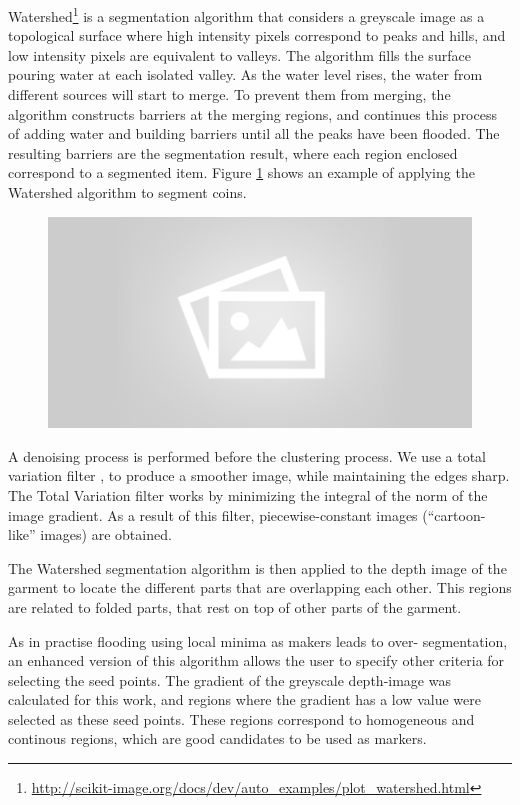 Watershed\footnote{\url{http://scikit-image.org/docs/dev/auto_examples/plot_watershed.html}} is a segmentation algorithm that considers a greyscale image as a topological surface where high intensity pixels correspond to peaks and hills, and low intensity pixels are equivalent to valleys. The algorithm fills the surface pouring water at each isolated valley. As the water level rises, the water from different sources will start to merge. To prevent them from merging, the algorithm constructs barriers at the merging regions, and continues this process of adding water and building barriers until all the peaks have been flooded. The resulting barriers are the segmentation result, where each region enclosed correspond to a segmented item. Figure \ref{fig:watershed_example} shows an example of applying the Watershed algorithm to segment coins.

\begin{figure}[thpb]
    \centering
    \includegraphics[width=0.7
    \textwidth]{figures/placeholder2.png}
    \caption{}
    \label{fig:watershed_example}
\end{figure}

A denoising process is performed before the clustering process. We use a total variation filter , to produce a smoother image, while maintaining the edges sharp. The Total Variation filter works by minimizing the integral of the norm of the image gradient. As a result of this filter, piecewise-constant images (``cartoon-like'' images) are obtained.

The Watershed segmentation algorithm is then applied to the depth image of the garment to locate the different parts that are overlapping each other. This regions are related to folded parts, that rest on top of other parts of the garment. 

As in practise flooding using local minima as makers leads to over- segmentation, an enhanced version of this algorithm allows the user to specify other criteria for selecting the seed points. The gradient of the greyscale depth-image was calculated for this work, and regions where the gradient has a low value were selected as these seed points. These regions correspond to homogeneous and continous regions, which are good candidates to be used as markers.

